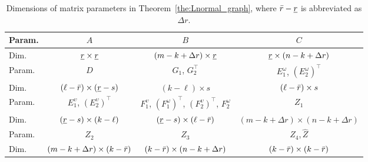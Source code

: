 \begin{table}[h]
\caption{Dimensions of matrix parameters in Theorem~\ref{the:Lnormal_graph}, where $\bar{r}-{\underline{r}}$ is abbreviated as $\Delta r$.}
\label{tab:mat_dims}
\centering
\renewcommand{\arraystretch}{1.}  %
\setlength{\tabcolsep}{4.5pt}        %
\begin{tabular}{lccc}
\toprule
Param. & $A$ & $B$ & $C$  \\
\midrule
Dim. & ${{\underline{r}}\times {\underline{r}}}$ & ${(m-k+\Delta r)\times {\underline{r}}}$ &  ${{\underline{r}}\times(n-k+\Delta r)}$ \\
\midrule
Param. & $D$ & $G_{1}$, $G_2^\top$ & $E_{1}^\omega$, $(E_{2}^\omega)^\top$
\\
\midrule
Dim. &  ${(\ell-\bar{r})\times({\underline{r}}-s)}$ &  ${(k-\ell)\times s}$ &
${(\ell-\bar{r})\times s}$
\\
\midrule
Param. &  $E_{1}^\upsilon$, $(E_{2}^\upsilon)^\top$ & $F^\upsilon_1$, $(F_1^\omega)^\top$, $(F^\upsilon_2)^\top$, $F_2^\omega$  & $Z_1$\\[2pt]
\midrule
Dim.  & ${({\underline{r}}-s)\times(k-\ell)}$ & 
${({\underline{r}}-s)\times (\ell-\bar{r})}$ & $(m-k+\Delta r)\times (n-k+\Delta r)$ \\[2pt]
\midrule
Param. & $Z_2$ & $Z_3$ & $Z_4$,\,$\hat{Z}$ \\
\midrule
Dim. & $(m-k+\Delta r)\times (k-\bar{r})$ &  $(k-\bar{r})\times (n-k+\Delta r)$ & {$(k-\bar{r})\times (k-\bar{r})$} \\
\bottomrule
\end{tabular}
\end{table}
